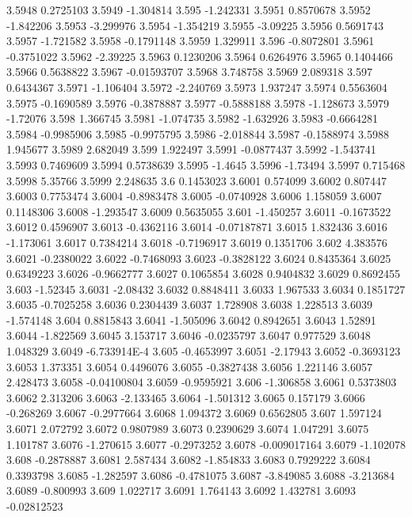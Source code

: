3.5948  0.2725103
3.5949  -1.304814
3.595  -1.242331
3.5951  0.8570678
3.5952  -1.842206
3.5953  -3.299976
3.5954  -1.354219
3.5955  -3.09225
3.5956  0.5691743
3.5957  -1.721582
3.5958  -0.1791148
3.5959  1.329911
3.596  -0.8072801
3.5961  -0.3751022
3.5962  -2.39225
3.5963  0.1230206
3.5964  0.6264976
3.5965  0.1404466
3.5966  0.5638822
3.5967  -0.01593707
3.5968  3.748758
3.5969  2.089318
3.597  0.6434367
3.5971  -1.106404
3.5972  -2.240769
3.5973  1.937247
3.5974  0.5563604
3.5975  -0.1690589
3.5976  -0.3878887
3.5977  -0.5888188
3.5978  -1.128673
3.5979  -1.72076
3.598  1.366745
3.5981  -1.074735
3.5982  -1.632926
3.5983  -0.6664281
3.5984  -0.9985906
3.5985  -0.9975795
3.5986  -2.018844
3.5987  -0.1588974
3.5988  1.945677
3.5989  2.682049
3.599  1.922497
3.5991  -0.0877437
3.5992  -1.543741
3.5993  0.7469609
3.5994  0.5738639
3.5995  -1.4645
3.5996  -1.73494
3.5997  0.715468
3.5998  5.35766
3.5999  2.248635
3.6  0.1453023
3.6001  0.574099
3.6002  0.807447
3.6003  0.7753474
3.6004  -0.8983478
3.6005  -0.0740928
3.6006  1.158059
3.6007  0.1148306
3.6008  -1.293547
3.6009  0.5635055
3.601  -1.450257
3.6011  -0.1673522
3.6012  0.4596907
3.6013  -0.4362116
3.6014  -0.07187871
3.6015  1.832436
3.6016  -1.173061
3.6017  0.7384214
3.6018  -0.7196917
3.6019  0.1351706
3.602  4.383576
3.6021  -0.2380022
3.6022  -0.7468093
3.6023  -0.3828122
3.6024  0.8435364
3.6025  0.6349223
3.6026  -0.9662777
3.6027  0.1065854
3.6028  0.9404832
3.6029  0.8692455
3.603  -1.52345
3.6031  -2.08432
3.6032  0.8848411
3.6033  1.967533
3.6034  0.1851727
3.6035  -0.7025258
3.6036  0.2304439
3.6037  1.728908
3.6038  1.228513
3.6039  -1.574148
3.604  0.8815843
3.6041  -1.505096
3.6042  0.8942651
3.6043  1.52891
3.6044  -1.822569
3.6045  3.153717
3.6046  -0.0235797
3.6047  0.977529
3.6048  1.048329
3.6049  -6.733914E-4
3.605  -0.4653997
3.6051  -2.17943
3.6052  -0.3693123
3.6053  1.373351
3.6054  0.4496076
3.6055  -0.3827438
3.6056  1.221146
3.6057  2.428473
3.6058  -0.04100804
3.6059  -0.9595921
3.606  -1.306858
3.6061  0.5373803
3.6062  2.313206
3.6063  -2.133465
3.6064  -1.501312
3.6065  0.157179
3.6066  -0.268269
3.6067  -0.2977664
3.6068  1.094372
3.6069  0.6562805
3.607  1.597124
3.6071  2.072792
3.6072  0.9807989
3.6073  0.2390629
3.6074  1.047291
3.6075  1.101787
3.6076  -1.270615
3.6077  -0.2973252
3.6078  -0.009017164
3.6079  -1.102078
3.608  -0.2878887
3.6081  2.587434
3.6082  -1.854833
3.6083  0.7929222
3.6084  0.3393798
3.6085  -1.282597
3.6086  -0.4781075
3.6087  -3.849085
3.6088  -3.213684
3.6089  -0.800993
3.609  1.022717
3.6091  1.764143
3.6092  1.432781
3.6093  -0.02812523
